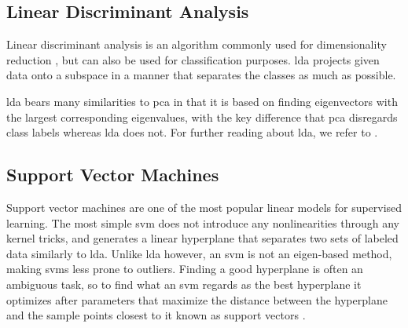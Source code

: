 


\subsection{Linear Discriminant Analysis}

Linear discriminant analysis is an algorithm commonly used for dimensionality reduction \citep{raschka_2014}, but can also be used for classification purposes. \gls{lda} projects given data onto a subspace in a manner that separates the classes as much as possible. 

\gls{lda} bears many similarities to \gls{pca} in that it is based on finding eigenvectors with the largest corresponding eigenvalues, with the key difference that \gls{pca} disregards class labels whereas \gls{lda} does not. For further reading about \gls{lda}, we refer to \citep{raschka_2014}.



\subsection{Support Vector Machines}

Support vector machines are one of the most popular linear models for supervised learning. The most simple \gls{svm} does not introduce any nonlinearities through any kernel tricks, and generates a linear hyperplane that separates two sets of labeled data similarly to \gls{lda}. Unlike \gls{lda} however, an \gls{svm} is not an eigen-based method, making \gls{svm}s less prone to outliers. Finding a good hyperplane is often an ambiguous task, so to find what an \gls{svm} regards as the best hyperplane it optimizes after parameters that maximize the distance between the hyperplane and the sample points closest to it known as support vectors \citep{boswell_2002}. 


